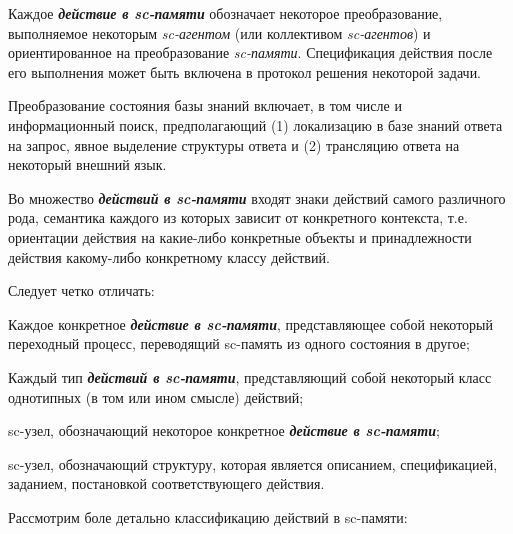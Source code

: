 Каждое \textbf{\textit{действие в sc-памяти}} обозначает некоторое преобразование, выполняемое некоторым \textit{sc-агентом} (или коллективом \textit{sc-агентов}) и ориентированное на преобразование \textit{sc-памяти}. Спецификация действия после его выполнения может быть включена в протокол решения некоторой задачи. 
	
Преобразование состояния базы знаний включает, в том числе и информационный поиск, предполагающий (1) локализацию в базе знаний ответа на запрос, явное выделение структуры ответа и (2) трансляцию ответа на некоторый внешний язык.

Во множество \textbf{\textit{действий в sc-памяти}} входят знаки действий самого различного рода, семантика каждого из которых зависит от конкретного контекста, т.е. ориентации действия на какие-либо конкретные объекты и принадлежности действия какому-либо конкретному классу действий.

Следует четко отличать:
\begin{textitemize}
	\item Каждое конкретное \textbf{\textit{действие в sc-памяти}}, представляющее собой некоторый переходный процесс, переводящий sc-память из одного состояния в другое;
	\item Каждый тип \textbf{\textit{действий в sc-памяти}}, представляющий собой некоторый класс однотипных (в том или ином смысле) действий;
	\item sc-узел, обозначающий некоторое конкретное \textbf{\textit{действие в sc-памяти}};
	\item sc-узел, обозначающий структуру, которая является описанием, спецификацией, заданием, постановкой соответствующего действия.
\end{textitemize}

Рассмотрим боле детально классификацию действий в sc-памяти:


